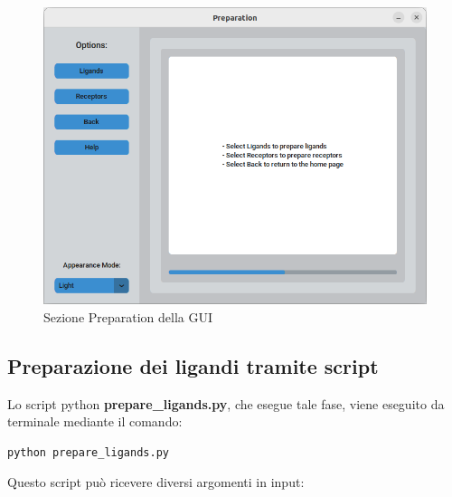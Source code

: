 \begin{figure}[H]
    \centering
    \includegraphics[scale=0.6]{immagini/capitolo3/preparation.png}
    \caption{Sezione Preparation della GUI}
    \label{fig:preparation}
\end{figure}

\subsection{Preparazione dei ligandi tramite script} \label{Preparazione dei ligandi script}
Lo script python \textbf{prepare\_ligands.py}, che esegue tale fase, viene eseguito da terminale mediante il comando:

\begin{lstlisting}[language=Bash, label=lst:code3, caption={Comando per scaricare la repository}]
python prepare_ligands.py
\end{lstlisting}

Questo script può ricevere diversi argomenti in input:


